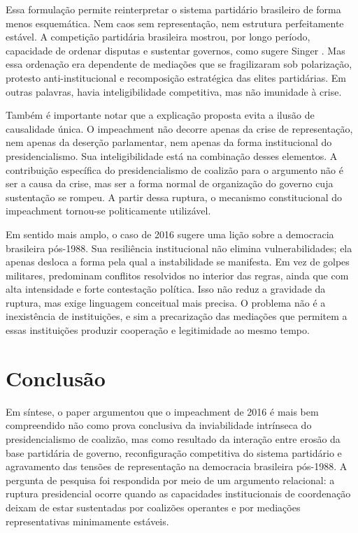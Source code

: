\documentclass[12pt,a4paper]{article}
\begin{document}
Essa formulação permite reinterpretar o sistema partidário brasileiro de forma menos esquemática. Nem caos sem representação, nem estrutura perfeitamente estável. A competição partidária brasileira mostrou, por longo período, capacidade de ordenar disputas e sustentar governos, como sugere Singer \textcite{singersd_tres_partidos}. Mas essa ordenação era dependente de mediações que se fragilizaram sob polarização, protesto anti-institucional e recomposição estratégica das elites partidárias. Em outras palavras, havia inteligibilidade competitiva, mas não imunidade à crise.

Também é importante notar que a explicação proposta evita a ilusão de causalidade única. O impeachment não decorre apenas da crise de representação, nem apenas da deserção parlamentar, nem apenas da forma institucional do presidencialismo. Sua inteligibilidade está na combinação desses elementos. A contribuição específica do presidencialismo de coalizão para o argumento não é ser a causa da crise, mas ser a forma normal de organização do governo cuja sustentação se rompeu. A partir dessa ruptura, o mecanismo constitucional do impeachment tornou-se politicamente utilizável.

Em sentido mais amplo, o caso de 2016 sugere uma lição sobre a democracia brasileira pós-1988. Sua resiliência institucional não elimina vulnerabilidades; ela apenas desloca a forma pela qual a instabilidade se manifesta. Em vez de golpes militares, predominam conflitos resolvidos no interior das regras, ainda que com alta intensidade e forte contestação política. Isso não reduz a gravidade da ruptura, mas exige linguagem conceitual mais precisa. O problema não é a inexistência de instituições, e sim a precarização das mediações que permitem a essas instituições produzir cooperação e legitimidade ao mesmo tempo.

\section{Conclusão}
\label{sec:org368fc47}
Em síntese, o paper argumentou que o impeachment de 2016 é mais bem compreendido não como prova conclusiva da inviabilidade intrínseca do presidencialismo de coalizão, mas como resultado da interação entre erosão da base partidária de governo, reconfiguração competitiva do sistema partidário e agravamento das tensões de representação na democracia brasileira pós-1988. A pergunta de pesquisa foi respondida por meio de um argumento relacional: a ruptura presidencial ocorre quando as capacidades institucionais de coordenação deixam de estar sustentadas por coalizões operantes e por mediações representativas minimamente estáveis.
\end{document}
